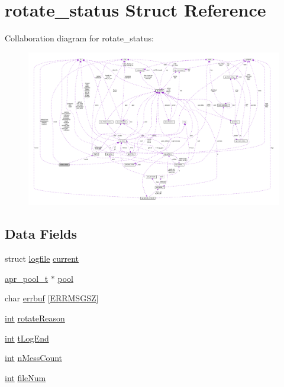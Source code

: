 \hypertarget{structrotate__status}{}\section{rotate\+\_\+status Struct Reference}
\label{structrotate__status}


Collaboration diagram for rotate\+\_\+status\+:
\nopagebreak
\begin{figure}[H]
\begin{center}
\leavevmode
\includegraphics[width=350pt]{structrotate__status__coll__graph}
\end{center}
\end{figure}
\subsection*{Data Fields}
\begin{DoxyCompactItemize}
\item 
struct \hyperlink{structlogfile}{logfile} \hyperlink{structrotate__status_aa4602e02425670bf0755ebb3ad8ee273}{current}
\item 
\hyperlink{structapr__pool__t}{apr\+\_\+pool\+\_\+t} $\ast$ \hyperlink{structrotate__status_a415ad41c3e4e0166fa1388307798452e}{pool}
\item 
char \hyperlink{structrotate__status_abf38a01e5e447932e99ac071f5e4a4f8}{errbuf} \mbox{[}\hyperlink{rotatelogs_8c_a02cbbece2445e43cb96e632136578950}{E\+R\+R\+M\+S\+G\+SZ}\mbox{]}
\item 
\hyperlink{pcre_8txt_a42dfa4ff673c82d8efe7144098fbc198}{int} \hyperlink{structrotate__status_a2f72f950099644fd1bfd13345e0ee3d2}{rotate\+Reason}
\item 
\hyperlink{pcre_8txt_a42dfa4ff673c82d8efe7144098fbc198}{int} \hyperlink{structrotate__status_a3105d9e9e30717aa497d702bf16105a8}{t\+Log\+End}
\item 
\hyperlink{pcre_8txt_a42dfa4ff673c82d8efe7144098fbc198}{int} \hyperlink{structrotate__status_a4d9b1c6bed2e8897b20b0972befac685}{n\+Mess\+Count}
\item 
\hyperlink{pcre_8txt_a42dfa4ff673c82d8efe7144098fbc198}{int} \hyperlink{structrotate__status_a6214b4f1578a09c8fa575221c267e955}{file\+Num}
\end{DoxyCompactItemize}


